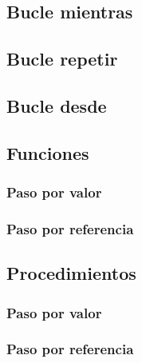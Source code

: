 \documentclass{article}
\begin{document}
\begin{appendices}
  

  \subsection{Bucle mientras}

  

  \subsection{Bucle repetir}

  

  \subsection{Bucle desde}

  

  \subsection{Funciones}
  
  \subsubsection{Paso por valor}


  \subsubsection{Paso por referencia}
  \subsection{Procedimientos}
  \subsubsection{Paso por valor}

  \subsubsection{Paso por referencia}




\end{appendices}
\end{document}
